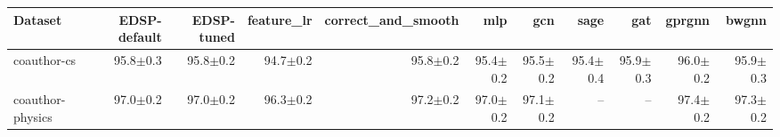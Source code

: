\begin{tabular}{lrrrrrrrrrr}
\toprule
Dataset & EDSP-default & EDSP-tuned & feature\_lr & correct\_and\_smooth & mlp & gcn & sage & gat & gprgnn & bwgnn \\
\midrule
coauthor-cs & 95.8$\pm$0.3 & 95.8$\pm$0.2 & 94.7$\pm$0.2 & 95.8$\pm$0.2 & 95.4$\pm$0.2 & 95.5$\pm$0.2 & 95.4$\pm$0.4 & 95.9$\pm$0.3 & 96.0$\pm$0.2 & 95.9$\pm$0.3 \\
coauthor-physics & 97.0$\pm$0.2 & 97.0$\pm$0.2 & 96.3$\pm$0.2 & 97.2$\pm$0.2 & 97.0$\pm$0.2 & 97.1$\pm$0.2 & -- & -- & 97.4$\pm$0.2 & 97.3$\pm$0.2 \\
\bottomrule
\end{tabular}

